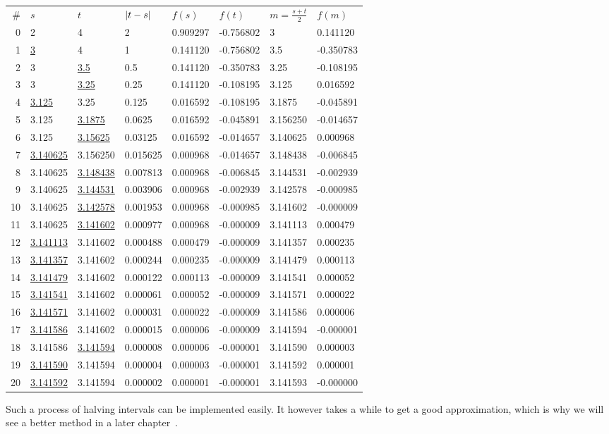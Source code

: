 \begin{center}
\begin{tabular}{@{}rl@{\,\,\,\,}l@{\,\,\,\,}l@{\,\,\,\,}l@{\,\,\,\,}l@{\,\,\,\,}l@{\,\,\,\,}l@{}}
\#&$s$&$t$&$\left|t-s\right|$&$f(s)$&$f(t)$&$m=\frac{s+t}{2}$&$f(m)$\\
0&2&4&2&0.909297&-0.756802&3&0.141120\\
1&\underline{3}&4&1&0.141120&-0.756802&3.5&-0.350783\\
2&3&\underline{3.5}&0.5&0.141120&-0.350783&3.25&-0.108195\\
3&3&\underline{3.25}&0.25&0.141120&-0.108195&3.125&0.016592\\
4&\underline{3.125}&3.25&0.125&0.016592&-0.108195&3.1875&-0.045891\\
5&3.125&\underline{3.1875}&0.0625&0.016592&-0.045891&3.156250&-0.014657\\
6&3.125&\underline{3.15625}&0.03125&0.016592&-0.014657&3.140625&0.000968\\
7&\underline{3.140625}&3.156250&0.015625&0.000968&-0.014657&3.148438&-0.006845\\
8&3.140625&\underline{3.148438}&0.007813&0.000968&-0.006845&3.144531&-0.002939\\
9&3.140625&\underline{3.144531}&0.003906&0.000968&-0.002939&3.142578&-0.000985\\
10&3.140625&\underline{3.142578}&0.001953&0.000968&-0.000985&3.141602&-0.000009\\
11&3.140625&\underline{3.141602}&0.000977&0.000968&-0.000009&3.141113&0.000479\\
12&\underline{3.141113}&3.141602&0.000488&0.000479&-0.000009&3.141357&0.000235\\
13&\underline{3.141357}&3.141602&0.000244&0.000235&-0.000009&3.141479&0.000113\\
14&\underline{3.141479}&3.141602&0.000122&0.000113&-0.000009&3.141541&0.000052\\
15&\underline{3.141541}&3.141602&0.000061&0.000052&-0.000009&3.141571&0.000022\\
16&\underline{3.141571}&3.141602&0.000031&0.000022&-0.000009&3.141586&0.000006\\
17&\underline{3.141586}&3.141602&0.000015&0.000006&-0.000009&3.141594&-0.000001\\
18&3.141586&\underline{3.141594}&0.000008&0.000006&-0.000001&3.141590&0.000003\\
19&\underline{3.141590}&3.141594&0.000004&0.000003&-0.000001&3.141592&0.000001\\
20&\underline{3.141592}&3.141594&0.000002&0.000001&-0.000001&3.141593&-0.000000\\
\end{tabular}
\end{center}
Such a process of halving intervals can be implemented easily. It however
takes a while to get a good approximation, which is why we will see a better
method in a later chapter~.

